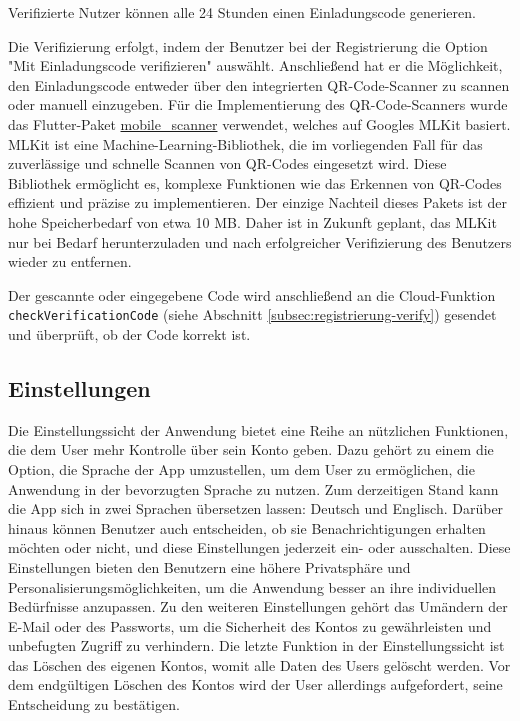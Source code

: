 Verifizierte Nutzer können alle 24 Stunden einen
Einladungscode generieren.

Die Verifizierung erfolgt, indem der Benutzer bei der Registrierung die Option "Mit Einladungscode verifizieren" auswählt. Anschließend hat er die Möglichkeit, den Einladungscode entweder über den integrierten QR-Code-Scanner zu scannen oder manuell einzugeben. Für die Implementierung des QR-Code-Scanners wurde das Flutter-Paket \href{https://pub.dev/packages/mobile_scanner}{mobile\_scanner} verwendet, welches auf Googles MLKit \cite{googlemlkit} basiert. MLKit ist eine Machine-Learning-Bibliothek, die im vorliegenden Fall für das zuverlässige und schnelle Scannen von QR-Codes eingesetzt wird. Diese Bibliothek ermöglicht es, komplexe Funktionen wie das Erkennen von QR-Codes effizient und präzise zu implementieren. Der einzige Nachteil dieses Pakets ist der hohe Speicherbedarf von etwa 10 MB. Daher ist in Zukunft geplant, das MLKit nur bei Bedarf herunterzuladen und nach erfolgreicher Verifizierung des Benutzers wieder zu entfernen.

Der gescannte oder eingegebene Code wird anschließend an die Cloud-Funktion \texttt{checkVerificationCode} (siehe Abschnitt \ref{subsec:registrierung-verify}) gesendet und überprüft, ob der Code korrekt ist.



\subsection{Einstellungen}
Die Einstellungssicht der Anwendung bietet eine Reihe an nützlichen Funktionen, die dem User mehr Kontrolle über sein Konto geben.
Dazu gehört zu einem die Option, die Sprache der App umzustellen, um dem User zu ermöglichen, die Anwendung in der bevorzugten Sprache zu nutzen. Zum derzeitigen Stand kann die App sich in zwei Sprachen übersetzen lassen: Deutsch und Englisch.
Darüber hinaus können Benutzer auch entscheiden, ob sie Benachrichtigungen erhalten möchten oder nicht, und diese Einstellungen jederzeit ein- oder ausschalten. Diese Einstellungen bieten den Benutzern eine höhere Privatsphäre und Personalisierungsmöglichkeiten, um die Anwendung besser an ihre individuellen Bedürfnisse anzupassen.
Zu den weiteren Einstellungen gehört das Umändern der E-Mail oder des Passworts, um die Sicherheit des Kontos zu gewährleisten und unbefugten Zugriff zu verhindern.
Die letzte Funktion in der Einstellungssicht ist das Löschen des eigenen Kontos, womit alle Daten des Users gelöscht werden. Vor dem endgültigen Löschen des Kontos wird der User allerdings aufgefordert, seine Entscheidung zu bestätigen.

